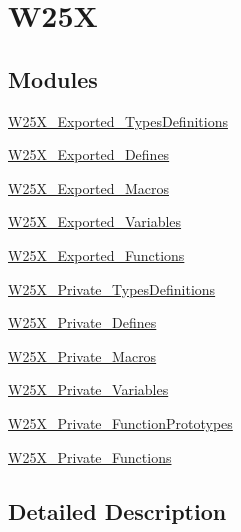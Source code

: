 \hypertarget{group___w25_x}{}\section{W25X}
\label{group___w25_x}
\subsection*{Modules}
\begin{DoxyCompactItemize}
\item 
\mbox{\hyperlink{group___w25_x___exported___types_definitions}{W25\+X\+\_\+\+Exported\+\_\+\+Types\+Definitions}}
\item 
\mbox{\hyperlink{group___w25_x___exported___defines}{W25\+X\+\_\+\+Exported\+\_\+\+Defines}}
\item 
\mbox{\hyperlink{group___w25_x___exported___macros}{W25\+X\+\_\+\+Exported\+\_\+\+Macros}}
\item 
\mbox{\hyperlink{group___w25_x___exported___variables}{W25\+X\+\_\+\+Exported\+\_\+\+Variables}}
\item 
\mbox{\hyperlink{group___w25_x___exported___functions}{W25\+X\+\_\+\+Exported\+\_\+\+Functions}}
\item 
\mbox{\hyperlink{group___w25_x___private___types_definitions}{W25\+X\+\_\+\+Private\+\_\+\+Types\+Definitions}}
\item 
\mbox{\hyperlink{group___w25_x___private___defines}{W25\+X\+\_\+\+Private\+\_\+\+Defines}}
\item 
\mbox{\hyperlink{group___w25_x___private___macros}{W25\+X\+\_\+\+Private\+\_\+\+Macros}}
\item 
\mbox{\hyperlink{group___w25_x___private___variables}{W25\+X\+\_\+\+Private\+\_\+\+Variables}}
\item 
\mbox{\hyperlink{group___w25_x___private___function_prototypes}{W25\+X\+\_\+\+Private\+\_\+\+Function\+Prototypes}}
\item 
\mbox{\hyperlink{group___w25_x___private___functions}{W25\+X\+\_\+\+Private\+\_\+\+Functions}}
\end{DoxyCompactItemize}


\subsection{Detailed Description}
